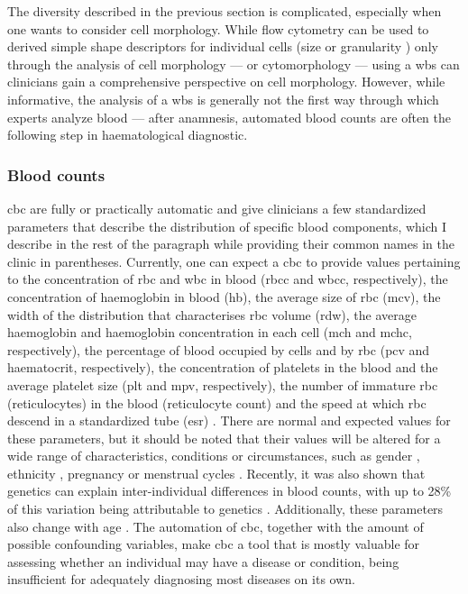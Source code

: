 The diversity described in the previous section is complicated, especially when one wants to consider cell morphology. While flow cytometry can be used to derived simple shape descriptors for individual cells (size or granularity \cite{Shapiro2005-ud}) only through the analysis of cell morphology --- or cytomorphology --- using a \ac{wbs} can clinicians gain a comprehensive perspective on cell morphology. However, while informative, the analysis of a \ac{wbs} is generally not the first way through which experts analyze blood --- after anamnesis, automated blood counts are often the following step in haematological diagnostic.

\subsubsection{Blood counts}

\Ac{cbc} are fully or practically automatic and give clinicians a few standardized parameters that describe the distribution of specific blood components, which I describe in the rest of the paragraph while providing their common names in the clinic in parentheses. Currently, one can expect a \ac{cbc} to provide values pertaining to the concentration of \ac{rbc} and \ac{wbc} in blood (\ac{rbcc} and \ac{wbcc}, respectively), the concentration of haemoglobin in blood (\ac{hb}), the average size of \ac{rbc} (\ac{mcv}), the width of the distribution that characterises \ac{rbc} volume (\ac{rdw}), the average haemoglobin and haemoglobin concentration in each cell (\ac{mch} and \ac{mchc}, respectively), the percentage of blood occupied by cells and by \ac{rbc} (\ac{pcv} and haematocrit, respectively), the concentration of platelets in the blood and the average platelet size (\ac{plt} and \ac{mpv}, respectively), the number of immature \ac{rbc} (reticulocytes) in the blood (reticulocyte count) and the speed at which \ac{rbc} descend in a standardized tube (\ac{esr}) \cite{Bain2014-oc,Evans1991-ri}. There are normal and expected values for these parameters, but it should be noted that their values will be altered for a wide range of characteristics, conditions or circumstances, such as gender \cite{Tong2019-eq,Guillet1998-hw}, ethnicity \cite{Lee2019-pr,Tong2019-eq}, pregnancy \cite{England1976-ff} or menstrual cycles \cite{Guillet1998-hw}. Recently, it was also shown that genetics can explain inter-individual differences in blood counts, with up to 28\% of this variation being attributable to genetics \cite{Vuckovic2020-eh}. Additionally, these parameters also change with age \cite{Kubota1991-at,Mahlknecht2010-mo,Siemons2014-wa}. The automation of \ac{cbc}, together with the amount of possible confounding variables, make \ac{cbc} a tool that is mostly valuable for assessing whether an individual may have a disease or condition, being insufficient for adequately diagnosing most diseases on its own.

